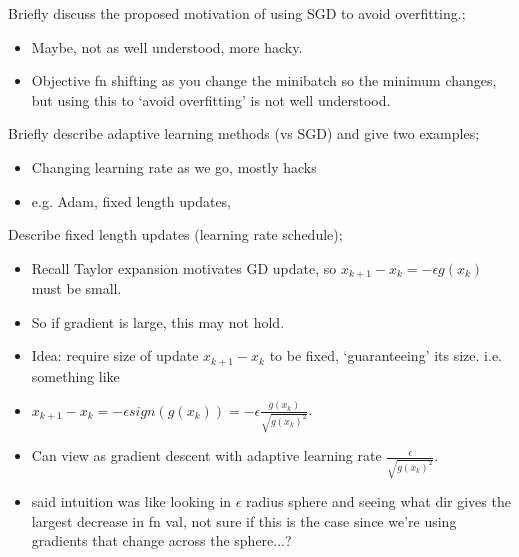 \documentclass{article}
\begin{document}
Briefly discuss the proposed motivation of using SGD to avoid overfitting.; \begin{itemize} \item Maybe, not as well understood, more hacky.  \item Objective fn shifting as you change the minibatch so the minimum changes, but using this to `avoid overfitting' is not well understood.  \end{itemize}

Briefly describe adaptive learning methods (vs SGD) and give two examples; \begin{itemize} \item Changing learning rate as we go, mostly hacks \item e.g. Adam, fixed length updates, \end{itemize} 

Describe fixed length updates (learning rate schedule); \begin{itemize} \item Recall Taylor expansion motivates GD update, so $x_{k+1}-x_k = -\epsilon g(x_k)$ must be small.  \item So if gradient is large, this may not hold.  \item Idea: require size of update $x_{k+1}-x_k$ to be fixed, `guaranteeing' its size. i.e. something like \item $x_{k+1}-x_k = -\epsilon sign (g(x_k))=-\epsilon \frac{g(x_k)}{\sqrt{g(x_k)^2}}$.  \item Can view as gradient descent with adaptive learning rate $\frac{\epsilon}{\sqrt{g(x_k)^2}}$.  \item said intuition was like looking in $\epsilon$ radius sphere and seeing what dir gives the largest decrease in fn val, not sure if this is the case since we're using gradients that change across the sphere...?  \end{itemize}
\end{document}

